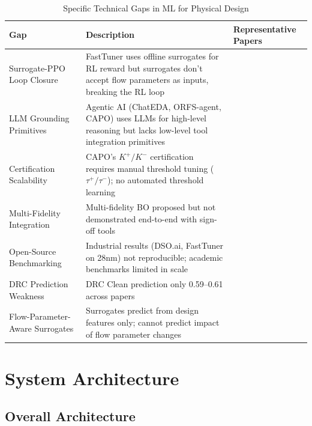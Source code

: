 \documentclass[10pt,conference]{IEEEtran}
\newcommand{\AUC}{\text{AUC}}
\begin{document}
\begin{table}[t]
\centering
\caption{Specific Technical Gaps in ML for Physical Design}
\label{tab:gaps}
\begin{tabular}{@{}lll@{}}
\toprule
Gap & Description & Representative Papers \\
\midrule
Surrogate-PPO Loop Closure & FastTuner \cite{hsiao2026fasttuner} uses offline surrogates for RL reward but surrogates don't accept flow parameters as inputs, breaking the RL loop & \cite{hsiao2026fasttuner} \\
LLM Grounding Primitives & Agentic AI (ChatEDA, ORFS-agent, CAPO) uses LLMs for high-level reasoning but lacks low-level tool integration primitives & \cite{ghose2026agentic,jiang2026capo} \\
Certification Scalability & CAPO's $K^+/K^-$ certification requires manual threshold tuning ($\tau^+/\tau^-$); no automated threshold learning & \cite{jiang2026capo} \\
Multi-Fidelity Integration & Multi-fidelity BO proposed \cite{chen2025graph,shrirao2024intelligent} but not demonstrated end-to-end with sign-off tools & \cite{chen2025graph,shrirao2024intelligent} \\
Open-Source Benchmarking & Industrial results (DSO.ai, FastTuner on 28nm) not reproducible; academic benchmarks limited in scale & \cite{verma2024dso,hsiao2026fasttuner} \\
DRC Prediction Weakness & DRC Clean prediction \AUC{} only 0.59--0.61 across papers & \cite{mutar2026auto, this work} \\
Flow-Parameter-Aware Surrogates & Surrogates predict from design features only; cannot predict impact of flow parameter changes & \cite{hsiao2026fasttuner, this work} \\
\bottomrule
\end{tabular}
\end{table}


\section{System Architecture}
\label{sec:architecture}

\subsection{Overall Architecture}
\end{document}
